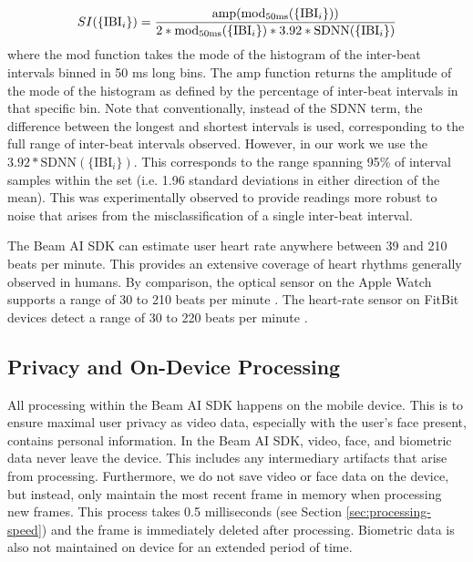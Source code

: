 \documentclass{article}
\begin{document}
\begin{itemize}
\begin{itemize}
    \vspace{0.1in}
    \begin{equation}
        SI(\{\text{IBI}_i\}) = \frac{\text{amp}(\text{mod}_\text{50ms}(\{\text{IBI}_i\}))}{ 2 * \text{mod}_\text{50ms}(\{\text{IBI}_i\}) * 3.92 * \text{SDNN}(\{\text{IBI}_i\})}
        \vspace{0.1in}
    \end{equation}
    where the $\text{mod}$ function takes the mode of the histogram of the inter-beat intervals binned in 50 ms long bins. The $\text{amp}$ function returns the amplitude of the mode of the histogram as defined by the percentage of inter-beat intervals in that specific bin. Note that conventionally, instead of the SDNN term, the difference between the longest and shortest intervals is used, corresponding to the full range of inter-beat intervals observed. However, in our work we use the $3.92 * \text{SDNN}(\{\text{IBI}_i\})$. This corresponds to the range spanning 95\% of interval samples within the set (i.e. 1.96 standard deviations in either direction of the mean). This was experimentally observed to provide readings more robust to noise that arises from the misclassification of a single inter-beat interval. 
\end{itemize}
\end{itemize}

The Beam AI SDK can estimate user heart rate anywhere between 39 and 210 beats per minute. This provides an extensive coverage of heart rhythms generally observed in humans. By comparison, the optical sensor on the Apple Watch supports a range of 30 to 210 beats per minute \cite{AppleSupport2022}. The heart-rate sensor on FitBit devices detect a range of 30 to 220 beats per minute \cite{FitBitHealthSolutions2022}. 

\subsection{Privacy and On-Device Processing} 

All processing within the Beam AI SDK happens on the mobile device. This is to ensure maximal user privacy as video data, especially with the user's face present, contains personal information. In the Beam AI SDK, video, face, and biometric data never leave the device. This includes any intermediary artifacts that arise from processing. Furthermore, we do not save video or face data on the device, but instead, only maintain the most recent frame in memory when processing new frames. This process takes 0.5 milliseconds (see Section \ref{sec:processing-speed}) and the frame is immediately deleted after processing. Biometric data is also not maintained on device for an extended period of time. 
\end{document}
